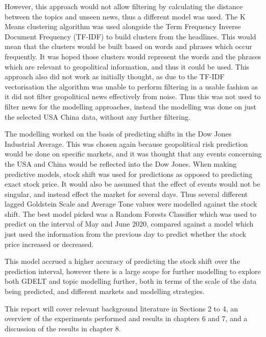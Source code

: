 However, this approach would not allow filtering by calculating the distance between the topics and unseen news, thus a different model was used. The K Means clustering algorithm was used alongside the Term Frequency Inverse Document Frequency (TF-IDF) to build clusters from the headlines. This would mean that the clusters would be built based on words and phrases which occur frequently. It was hoped those clusters would represent the words and the phrases which are relevant to geopolitical information, and thus it could be used. This approach also did not work as initially thought, as due to the TF-IDF vectorisation the algorithm was unable to perform filtering in a usable fashion as it did not filter geopolitical news effectively from noise. Thus this was not used to filter news for the modelling approaches, instead the modelling was done on just the selected USA China data, without any further filtering. 

The modelling worked on the basis of predicting shifts in the Dow Jones Industrial Average. This was chosen again because geopolitical risk prediction would be done on specific markets, and it was thought that any events concerning the USA and China would be reflected into the Dow Jones. When making predictive models, stock shift was used for predictions as opposed to predicting exact stock price. It would also be assumed that the effect of events would not be singular, and instead effect the market for several days. Thus several different lagged Goldstein Scale and Average Tone values were modelled against the stock shift. The best model picked was a Random Forests Classifier which was used to predict on the interval of May and June 2020, compared against a model which just used the information from the previous day to predict whether the stock price increased or decreased. 

This model accrued a higher accuracy of predicting the stock shift over the prediction interval, however there is a large scope for further modelling to explore both GDELT and topic modelling further, both in terms of the scale of the data being predicted, and different markets and modelling strategies. 

This report will cover relevant background literature in Sections 2 to 4, an overview of the experiments performed and results in chapters 6 and 7, and a discussion of the results in chapter 8.
